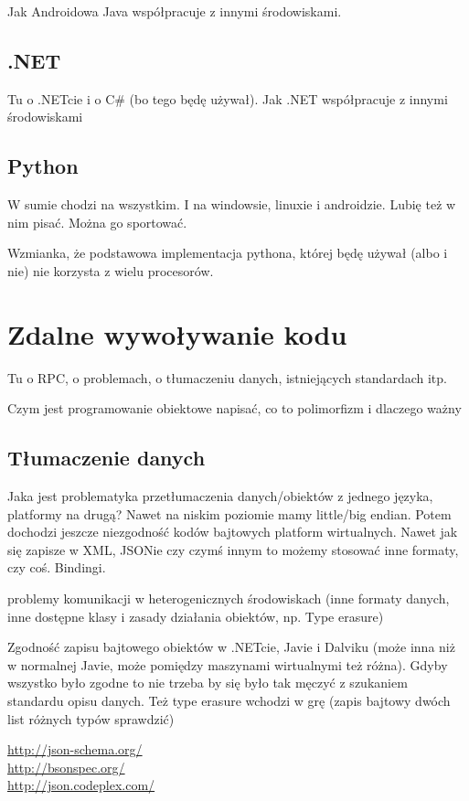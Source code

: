 Jak Androidowa Java współpracuje z innymi środowiskami.

\subsection{.NET}
Tu o .NETcie i o C\# (bo tego będę używał).
Jak .NET współpracuje z innymi środowiskami

\subsection{Python}
W sumie chodzi na wszystkim. I na windowsie, linuxie i androidzie. Lubię też w nim pisać. Można go sportować.

Wzmianka, że podstawowa implementacja pythona, której będę używał (albo i nie) nie korzysta z wielu procesorów.

\section{Zdalne wywoływanie kodu}
Tu o RPC, o problemach, o tłumaczeniu danych, istniejących standardach itp.

Czym jest programowanie obiektowe napisać, co to polimorfizm i dlaczego ważny

\subsection{Tłumaczenie danych}
Jaka jest problematyka przetłumaczenia danych/obiektów z jednego języka, platformy na drugą?
Nawet na niskim poziomie mamy little/big endian. Potem dochodzi jeszcze niezgodność kodów bajtowych platform wirtualnych.
Nawet jak się zapisze w XML, JSONie czy czymś innym to możemy stosować inne formaty, czy coś. Bindingi.

problemy komunikacji w heterogenicznych środowiskach (inne formaty danych, inne dostępne klasy i zasady działania obiektów, np. Type erasure)

Zgodność zapisu bajtowego obiektów w .NETcie, Javie i Dalviku (może inna niż w normalnej Javie, może pomiędzy maszynami wirtualnymi też różna). Gdyby wszystko było zgodne to nie trzeba by się było tak męczyć z szukaniem standardu opisu danych. Też type erasure wchodzi w grę (zapis bajtowy dwóch list różnych typów sprawdzić)

\url{http://json-schema.org/}\\
\url{http://bsonspec.org/}\\
\url{http://json.codeplex.com/}\\

